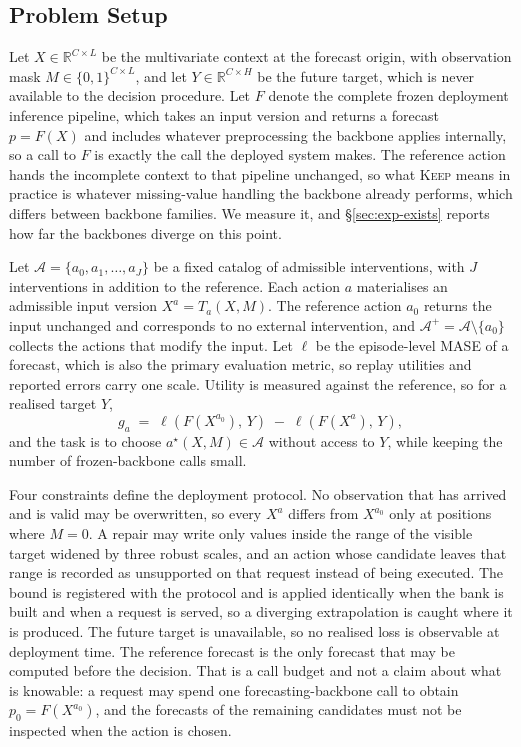 \documentclass{article}
\newcommand{\calA}{\mathcal{A}}
\newcommand{\loss}{\ell}
\begin{document}
\subsection{Problem Setup}
\label{sec:method-problem}
Let $X \in \mathbb{R}^{C \times L}$ be the multivariate context at the forecast origin, with
observation mask $M \in \{0,1\}^{C \times L}$, and let $Y \in \mathbb{R}^{C \times H}$ be the
future target, which is never available to the decision procedure. Let $F$ denote the complete
frozen deployment inference pipeline, which takes an input version and returns a forecast
$p = F(X)$ and includes whatever preprocessing the backbone applies internally, so a call to
$F$ is exactly the call the deployed system makes. The reference action hands the incomplete
context to that pipeline unchanged, so what \textsc{Keep} means in practice is whatever
missing-value handling the backbone already performs, which differs between backbone families.
We measure it, and \S\ref{sec:exp-exists} reports how far the backbones diverge on this point.

Let $\calA = \{a_0, a_1, \dots, a_J\}$ be a fixed catalog of admissible interventions, with
$J$ interventions in addition to the reference. Each action $a$ materialises an admissible
input version $X^{a} = T_a(X, M)$. The reference action $a_0$ returns the input unchanged and
corresponds to no external intervention, and $\calA^{+} = \calA \setminus \{a_0\}$ collects
the actions that modify the input. Let $\loss$ be the episode-level MASE of a forecast, which is also the primary evaluation
metric, so replay utilities and reported errors carry one scale. Utility is measured against the reference, so for a realised target
$Y$,
\begin{equation}
  g_a \;=\; \loss\!\left(F(X^{a_0}),\, Y\right) \;-\; \loss\!\left(F(X^{a}),\, Y\right),
  \label{eq:utility}
\end{equation}
and the task is to choose $a^\star(X, M) \in \calA$ without access to $Y$, while keeping the
number of frozen-backbone calls small.

Four constraints define the deployment protocol. No observation that has arrived and is valid
may be overwritten, so every $X^{a}$ differs from $X^{a_0}$ only at positions where $M = 0$.
A repair may write only values inside the range of the visible target widened by three robust
scales, and an action whose candidate leaves that range is recorded as unsupported on that
request instead of being executed. The bound is registered with the protocol and is applied
identically when the bank is built and when a request is served, so a diverging extrapolation
is caught where it is produced. The future target is unavailable, so no realised loss is
observable at deployment time. The reference forecast is the only forecast that may be computed
before the decision. That is a call budget and not a claim about what is knowable: a
request may spend one forecasting-backbone call to obtain $p_0 = F(X^{a_0})$, and the forecasts
of the remaining candidates must not be inspected when the action is chosen.
\end{document}
